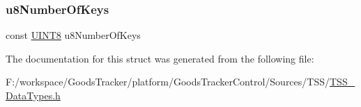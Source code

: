 \subsubsection{\texorpdfstring{u8\+Number\+Of\+Keys}{u8NumberOfKeys}}
{\footnotesize\ttfamily const \hyperlink{_t_s_s___data_types_8h_ab27e9918b538ce9d8ca692479b375b6a}{U\+I\+N\+T8} u8\+Number\+Of\+Keys}



The documentation for this struct was generated from the following file\+:\begin{DoxyCompactItemize}
\item 
F\+:/workspace/\+Goods\+Tracker/platform/\+Goods\+Tracker\+Control/\+Sources/\+T\+S\+S/\hyperlink{_t_s_s___data_types_8h}{T\+S\+S\+\_\+\+Data\+Types.\+h}\end{DoxyCompactItemize}

